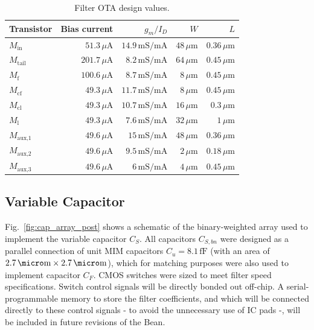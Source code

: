 \begin{table}[!t]
	\begin{center}
		\begin{tabular}{|l|r|r|r|r|}\hline
			Transistor & Bias current & $g_m/I_D$ & $W$ & $L$ \\ \hline\hline
			$M_\text{in}$ & $51.3\,\mu\text{A}$  & $14.9\,\text{mS}/\text{mA}$  & $48\,\mu\text{m}$ & $0.36\,\mu\text{m}$ \\ \hline
			$M_\text{tail}$ & $201.7\,\mu\text{A}$  & $8.2\,\text{mS}/\text{mA}$  & $64\,\mu\text{m}$ & $0.45\,\mu\text{m}$ \\ \hline 
			$M_\text{f}$ & $100.6\,\mu\text{A}$  & $8.7\,\text{mS}/\text{mA}$  & $8\,\mu\text{m}$ & $0.45\,\mu\text{m}$ \\ \hline
			$M_\text{cf}$ & $49.3\,\mu\text{A}$  & $11.7\,\text{mS}/\text{mA}$  & $8\,\mu\text{m}$ & $0.45\,\mu\text{m}$ \\ \hline
			$M_\text{cl}$ & $49.3\,\mu\text{A}$  & $10.7\,\text{mS}/\text{mA}$  & $16\,\mu\text{m}$ & $0.3\,\mu\text{m}$ \\ \hline
			$M_\text{l}$ & $49.3\,\mu\text{A}$  & $7.6\,\text{mS}/\text{mA}$  & $32\,\mu\text{m}$ & $1\,\mu\text{m}$ \\ \hline
			$M_\text{aux,1}$ & $49.6\,\mu\text{A}$  & $15\,\text{mS}/\text{mA}$  & $48\,\mu\text{m}$ & $0.36\,\mu\text{m}$ \\ \hline
			$M_\text{aux,2}$ & $49.6\,\mu\text{A}$  & $9.5\,\text{mS}/\text{mA}$  & $2\,\mu\text{m}$ & $0.18\,\mu\text{m}$ \\ \hline
			$M_\text{aux,3}$ & $49.6\,\mu\text{A}$  & $6\,\text{mS}/\text{mA}$  & $4\,\mu\text{m}$ & $0.45\,\mu\text{m}$ \\ \hline
		\end{tabular}
		\vspace*{5pt}
		\caption{Filter OTA design values.}
		\label{tab:OTA_sizes}
	\end{center}
\end{table}

\subsection{Variable Capacitor}
Fig.~\ref{fig:cap_array_post} shows a schematic of the binary-weighted array used to implement the variable capacitor $C_S$. All capacitors $C_{S,bn}$ were designed as a parallel connection of unit MIM capacitors $C_u=8.1\,\text{fF}$  (with an area of $2.7\,\micro\text{m}\times2.7\,\micro\text{m}$), which for matching purposes were also used to implement capacitor $C_F$. CMOS switches were sized to meet filter speed specifications.  Switch control signals will be directly bonded out off-chip. A \mbox{serial-programmable} memory to store the filter coefficients, and which will be connected directly to these control signals - to avoid the \mbox{unnecessary} use of IC pads -, will be included in future revisions of the Bean.

